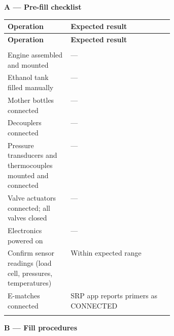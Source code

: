\medskip
\noindent\textbf{A --- Pre-fill checklist}

\medskip
\begin{xltabular}{\linewidth}{@{}>{\raggedright\arraybackslash}p{0.38\linewidth} X@{}}
\toprule
\textbf{Operation} & \textbf{Expected result} \\
\midrule
\endfirsthead
\toprule
\textbf{Operation} & \textbf{Expected result} \\
\midrule
\endhead
\midrule
{} \\
\endfoot
\bottomrule
\endlastfoot
Engine assembled and mounted & --- \\
Ethanol tank filled manually & --- \\
Mother bottles connected & --- \\
Decouplers connected & --- \\
Pressure transducers and thermocouples mounted and connected & --- \\
Valve actuators connected; all valves closed & --- \\
Electronics powered on & --- \\
Confirm sensor readings (load cell, pressures, temperatures) & Within expected range \\
E-matches connected & SRP app reports primers as CONNECTED \\
 \\
\end{xltabular}

\medskip
\noindent\textbf{B --- Fill procedures}

